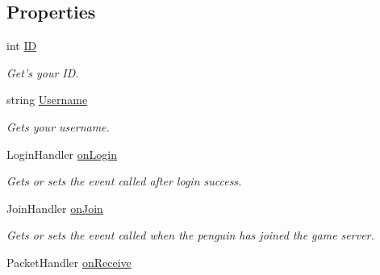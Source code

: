 \subsection*{Properties}
\begin{DoxyCompactItemize}
\item 
\hypertarget{classSharpenguin_1_1PenguinBase_aae21196fbe688005b7a0d0a0b8bf42ed}{int \hyperlink{classSharpenguin_1_1PenguinBase_aae21196fbe688005b7a0d0a0b8bf42ed}{I\-D}}\label{classSharpenguin_1_1PenguinBase_aae21196fbe688005b7a0d0a0b8bf42ed}

\begin{DoxyCompactList}\small\item\em Get's your I\-D. \end{DoxyCompactList}\item 
\hypertarget{classSharpenguin_1_1PenguinBase_af52eaa01201024b8c065f53e85120d12}{string \hyperlink{classSharpenguin_1_1PenguinBase_af52eaa01201024b8c065f53e85120d12}{Username}}\label{classSharpenguin_1_1PenguinBase_af52eaa01201024b8c065f53e85120d12}

\begin{DoxyCompactList}\small\item\em Gets your username. \end{DoxyCompactList}\item 
\hypertarget{classSharpenguin_1_1PenguinBase_a370b4ae2070f96b55fbef267d4d6b27e}{Login\-Handler \hyperlink{classSharpenguin_1_1PenguinBase_a370b4ae2070f96b55fbef267d4d6b27e}{on\-Login}}\label{classSharpenguin_1_1PenguinBase_a370b4ae2070f96b55fbef267d4d6b27e}

\begin{DoxyCompactList}\small\item\em Gets or sets the event called after login success. \end{DoxyCompactList}\item 
\hypertarget{classSharpenguin_1_1PenguinBase_a671a22a751f91b472db6f427c618c131}{Join\-Handler \hyperlink{classSharpenguin_1_1PenguinBase_a671a22a751f91b472db6f427c618c131}{on\-Join}}\label{classSharpenguin_1_1PenguinBase_a671a22a751f91b472db6f427c618c131}

\begin{DoxyCompactList}\small\item\em Gets or sets the event called when the penguin has joined the game server. \end{DoxyCompactList}\item 
\hypertarget{classSharpenguin_1_1PenguinBase_ac2b810a66bab0069126d07ebe0ccfa42}{Packet\-Handler \hyperlink{classSharpenguin_1_1PenguinBase_ac2b810a66bab0069126d07ebe0ccfa42}{on\-Receive}}\label{classSharpenguin_1_1PenguinBase_ac2b810a66bab0069126d07ebe0ccfa42}


\end{DoxyCompactItemize}
